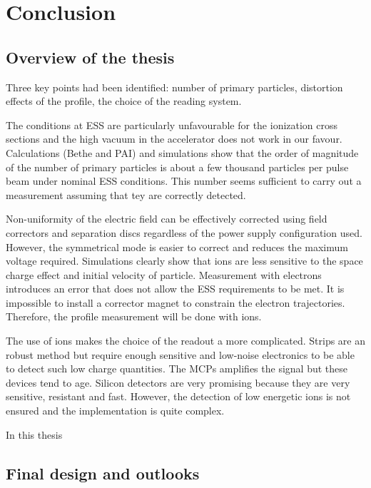 \chapter{Conclusion}
\cleardoublepage

\minitoc

\section{Overview of the thesis}
\begin{refsection}


  Three key points had been identified: number of primary particles, distortion effects of the profile, the choice of the reading system. 
  
  The conditions at ESS are particularly unfavourable for the ionization cross sections and the high vacuum in the accelerator does not work in our favour. Calculations (Bethe and PAI) and simulations show that the order of magnitude of the number of primary particles is about a few thousand particles per pulse beam under nominal ESS conditions. This number seems sufficient to carry out a measurement assuming that tey are correctly detected.

  Non-uniformity of the electric field can be effectively corrected using field correctors and separation discs regardless of the power supply configuration used. However, the symmetrical mode is easier to correct and reduces the maximum voltage required.
  Simulations clearly show that ions are less sensitive to the space charge effect and initial velocity of particle. Measurement with electrons introduces an error that does not allow the ESS requirements to be met. It is impossible to install a corrector magnet to constrain the electron trajectories. Therefore, the profile measurement will be done with ions.

  The use of ions makes the choice of the readout a more complicated. Strips are an robust method but require enough sensitive and low-noise electronics to be able to detect such low charge quantities.
  The MCPs amplifies the signal but these devices tend to age. Silicon detectors are very promising because they are very sensitive, resistant and fast. However, the detection of low energetic ions is not ensured and the implementation is quite complex. 

  In this thesis

  \section{Final design and outlooks}



\end{refsection}

